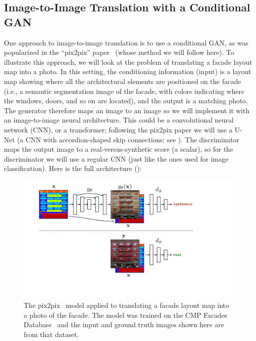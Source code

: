 \subsection{Image-to-Image Translation with a Conditional GAN}  One approach to image-to-image translation is to use a conditional GAN, as was popularized in the ``pix2pix'' paper~\cite{pix2pix2017} (whose method we will follow here). To illustrate this approach, we will look at the problem of translating a facade layout map into a photo. In this setting, the conditioning information (input) is a layout map showing where all the architectural elements are positioned on the facade (i.e., a semantic segmentation image of the facade, with colors indicating where the windows, doors, and so on are located), and the output is a matching photo. The generator therefore maps an image to an image so we will implement it with an image-to-image neural architecture. This could be a convolutional neural network (CNN), or a transformer; following the pix2pix paper we will use a U-Net (a CNN with accordion-shaped skip connections; see \sect{\ref{sec:convolutional_neural_nets:unet}}). The discriminator maps the output image to a real-versus-synthetic score (a scalar), so for the discriminator we will use a regular CNN (just like the ones used for image classification). Here is the full architecture (\fig{\ref{fig:conditional_generative_models:pix2pix_facades_arch}}):
\begin{figure}[h!]
    \centerline{
    \includegraphics[width=0.9\linewidth]{./figures/conditional_generative_models/pix2pix_facades_arch.pdf}
    }
    \caption{The pix2pix~\cite{pix2pix2017} model applied to translating a facade layout map into a photo of the facade. The model was trained on the CMP Facades Database~\cite{Tylecek13} and the input and ground truth images shown here are from that dataset.}
    \label{fig:conditional_generative_models:pix2pix_facades_arch}
\end{figure}

